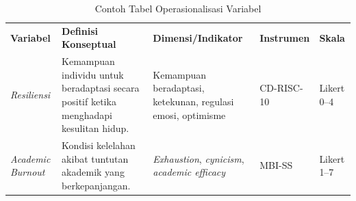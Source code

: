 \documentclass[
  indonesian,
  letterpaper,
  DIV=11,
  numbers=noendperiod]{scrreprt}
\begin{document}
\begin{longtable}[]{@{}
  >{\raggedright\arraybackslash}p{}
  >{\raggedright\arraybackslash}p{}
  >{\raggedright\arraybackslash}p{}
  >{\raggedright\arraybackslash}p{}
  >{\raggedright\arraybackslash}p{}@{}}
\caption{Contoh Tabel Operasionalisasi
Variabel}\label{tbl-operasionalisasi}\tabularnewline
\toprule\noalign{}
\endfirsthead
\endhead
\bottomrule\noalign{}
\endlastfoot
\textbf{Variabel} & \textbf{Definisi Konseptual} &
\textbf{Dimensi/Indikator} & \textbf{Instrumen} & \textbf{Skala} \\
\emph{Resiliensi} & Kemampuan individu untuk beradaptasi secara positif
ketika menghadapi kesulitan hidup. & Kemampuan beradaptasi, ketekunan,
regulasi emosi, optimisme & CD-RISC-10 & Likert 0--4 \\
\emph{Academic Burnout} & Kondisi kelelahan akibat tuntutan akademik
yang berkepanjangan. & \emph{Exhaustion}, \emph{cynicism},
\emph{academic efficacy} & MBI-SS & Likert 1--7 \\
\end{longtable}
\end{document}
